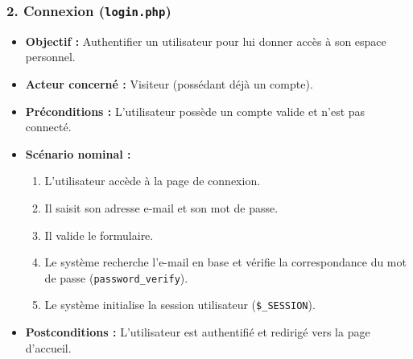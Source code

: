 \documentclass[a4paper,12pt]{article}
\begin{document}
\subsubsection*{2. Connexion (\texttt{login.php})}
\begin{itemize}[label=\textbullet]
    \item \textbf{Objectif :} Authentifier un utilisateur pour lui donner accès à son espace personnel.
    \item \textbf{Acteur concerné :} Visiteur (possédant déjà un compte).
    \item \textbf{Préconditions :} L'utilisateur possède un compte valide et n'est pas connecté.
    \item \textbf{Scénario nominal :}
    \begin{enumerate}[label=\arabic*.]
        \item L'utilisateur accède à la page de connexion.
        \item Il saisit son adresse e-mail et son mot de passe.
        \item Il valide le formulaire.
        \item Le système recherche l'e-mail en base et vérifie la correspondance du mot de passe (\texttt{password\_verify}).
        \item Le système initialise la session utilisateur (\texttt{\$\_SESSION}).
    \end{enumerate}
    \item \textbf{Postconditions :} L'utilisateur est authentifié et redirigé vers la page d'accueil.
\end{itemize}

\vspace{0.3cm}

\end{document}

